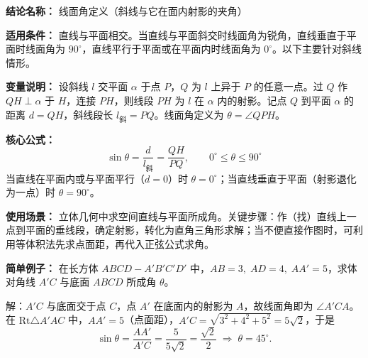 \textbf{结论名称：} 线面角定义（斜线与它在面内射影的夹角）

\textbf{适用条件：} 直线与平面相交。当直线与平面斜交时线面角为锐角，直线垂直于平面时线面角为 \(90^\circ\)，直线平行于平面或在平面内时线面角为 \(0^\circ\)。以下主要针对斜线情形。

\textbf{变量说明：} 设斜线 \(l\) 交平面 \(\alpha\) 于点 \(P\)，\(Q\) 为 \(l\) 上异于 \(P\) 的任意一点。过 \(Q\) 作 \(QH\perp\alpha\) 于 \(H\)，连接 \(PH\)，则线段 \(PH\) 为 \(l\) 在 \(\alpha\) 内的射影。记点 \(Q\) 到平面 \(\alpha\) 的距离 \(d=QH\)，斜线段长 \(l_{\text{斜}}=PQ\)。线面角定义为 \(\theta=\angle QPH\)。

\textbf{核心公式：}
\[
\boxed{\sin\theta = \frac{d}{l_{\text{斜}}} = \frac{QH}{PQ},\qquad 0^\circ \le \theta \le 90^\circ}
\]
当直线在平面内或与平面平行（\(d=0\)）时 \(\theta=0^\circ\)；当直线垂直于平面（射影退化为一点）时 \(\theta=90^\circ\)。

\textbf{使用场景：} 立体几何中求空间直线与平面所成角。关键步骤：作（找）直线上一点到平面的垂线段，确定射影，转化为直角三角形求解；当不便直接作图时，可利用等体积法先求点面距，再代入正弦公式求角。

\textbf{简单例子：} 在长方体 \(ABCD-A'B'C'D'\) 中，\(AB=3,\;AD=4,\;AA'=5\)，求体对角线 \(A'C\) 与底面 \(ABCD\) 所成角 \(\theta\)。

解：\(A'C\) 与底面交于点 \(C\)，点 \(A'\) 在底面内的射影为 \(A\)，故线面角即为 \(\angle A'CA\)。在 \(\mathrm{Rt}\triangle A'AC\) 中，\(AA'=5\)（点面距），\(A'C=\sqrt{3^2+4^2+5^2}=5\sqrt{2}\)，于是
\[
\sin\theta = \frac{AA'}{A'C} = \frac{5}{5\sqrt{2}} = \frac{\sqrt{2}}{2} \;\Longrightarrow\; \theta = 45^\circ.
\]